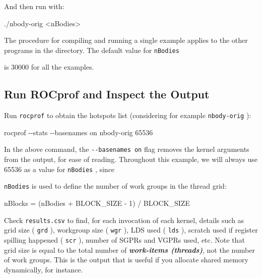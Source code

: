\documentclass[
]{article}
\let\oldtexttt\texttt
\renewcommand{\texttt}[1]{
  \colorbox{Light}{\oldtexttt{#1}}
}
\newenvironment{Shaded}{}{}
\newcommand{\ExtensionTok}[1]{#1}
\newcommand{\NormalTok}[1]{#1}
\newcommand{\OperatorTok}[1]{\textcolor[rgb]{0.40,0.40,0.40}{#1}}
\begin{document}
And then run with:

\begin{Shaded}
\begin{Highlighting}[]
\ExtensionTok{./nbody{-}orig} \OperatorTok{\textless{}}\NormalTok{nBodies}\OperatorTok{\textgreater{}}
\end{Highlighting}
\end{Shaded}

The procedure for compiling and running a single example applies to the
other programs in the directory. The default value for \texttt{nBodies}
is 30000 for all the examples.

\hypertarget{run-rocprof-and-inspect-the-output}{%
\subsection{Run ROCprof and Inspect the
Output}\label{run-rocprof-and-inspect-the-output}}

Run \texttt{rocprof} to obtain the hotspots list (considering for
example \texttt{nbody-orig}):

\begin{Shaded}
\begin{Highlighting}[]
\ExtensionTok{rocprof}\NormalTok{ {-}{-}stats {-}{-}basenames on nbody{-}orig 65536}
\end{Highlighting}
\end{Shaded}

In the above command, the \texttt{-\/-basenames\ on} flag removes the
kernel arguments from the output, for ease of reading. Throughout this
example, we will always use 65536 as a value for \texttt{nBodies}, since
\texttt{nBodies} is used to define the number of work groups in the
thread grid:

\begin{Shaded}
\begin{Highlighting}[]
\ExtensionTok{nBlocks}\NormalTok{ = (nBodies + BLOCK\_SIZE {-} 1) }\ExtensionTok{/}\NormalTok{ BLOCK\_SIZE}
\end{Highlighting}
\end{Shaded}

Check \texttt{results.csv} to find, for each invocation of each kernel,
details such as grid size (\texttt{grd}), workgroup size (\texttt{wgr}),
LDS used (\texttt{lds}), scratch used if register spilling happened
(\texttt{scr}), number of SGPRs and VGPRs used, etc. Note that grid size
is equal to the total number of \textbf{\emph{work-items (threads)}},
not the number of work groups. This is the output that is useful if you
allocate shared memory dynamically, for instance.
\end{document}
